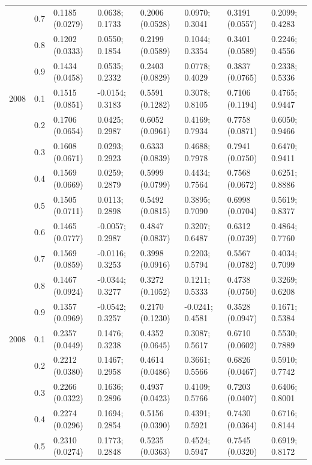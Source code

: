 \begin{table}
{\begin{tabular}[t]{llllllll}
 & 0.7 & 0.1185 (0.0279) & 0.0638; 0.1733 & 0.2006 (0.0528) & 0.0970; 0.3041 & 0.3191 (0.0557) & 0.2099; 0.4283\\
 & 0.8 & 0.1202 (0.0333) & 0.0550; 0.1854 & 0.2199 (0.0589) & 0.1044; 0.3354 & 0.3401 (0.0589) & 0.2246; 0.4556\\
 & 0.9 & 0.1434 (0.0458) & 0.0535; 0.2332 & 0.2403 (0.0829) & 0.0778; 0.4029 & 0.3837 (0.0765) & 0.2338; 0.5336\\
2008 & 0.1 & 0.1515 (0.0851) & -0.0154; 0.3183 & 0.5591 (0.1282) & 0.3078; 0.8105 & 0.7106 (0.1194) & 0.4765; 0.9447\\
 & 0.2 & 0.1706 (0.0654) & 0.0425; 0.2987 & 0.6052 (0.0961) & 0.4169; 0.7934 & 0.7758 (0.0871) & 0.6050; 0.9466\\
 & 0.3 & 0.1608 (0.0671) & 0.0293; 0.2923 & 0.6333 (0.0839) & 0.4688; 0.7978 & 0.7941 (0.0750) & 0.6470; 0.9411\\
 & 0.4 & 0.1569 (0.0669) & 0.0259; 0.2879 & 0.5999 (0.0799) & 0.4434; 0.7564 & 0.7568 (0.0672) & 0.6251; 0.8886\\
 & 0.5 & 0.1505 (0.0711) & 0.0113; 0.2898 & 0.5492 (0.0815) & 0.3895; 0.7090 & 0.6998 (0.0704) & 0.5619; 0.8377\\
 & 0.6 & 0.1465 (0.0777) & -0.0057; 0.2987 & 0.4847 (0.0837) & 0.3207; 0.6487 & 0.6312 (0.0739) & 0.4864; 0.7760\\
 & 0.7 & 0.1569 (0.0859) & -0.0116; 0.3253 & 0.3998 (0.0916) & 0.2203; 0.5794 & 0.5567 (0.0782) & 0.4034; 0.7099\\
 & 0.8 & 0.1467 (0.0924) & -0.0344; 0.3277 & 0.3272 (0.1052) & 0.1211; 0.5333 & 0.4738 (0.0750) & 0.3269; 0.6208\\
 & 0.9 & 0.1357 (0.0969) & -0.0542; 0.3257 & 0.2170 (0.1230) & -0.0241; 0.4581 & 0.3528 (0.0947) & 0.1671; 0.5384\\
2008 & 0.1 & 0.2357 (0.0449) & 0.1476; 0.3238 & 0.4352 (0.0645) & 0.3087; 0.5617 & 0.6710 (0.0602) & 0.5530; 0.7889\\
 & 0.2 & 0.2212 (0.0380) & 0.1467; 0.2958 & 0.4614 (0.0486) & 0.3661; 0.5566 & 0.6826 (0.0467) & 0.5910; 0.7742\\
 & 0.3 & 0.2266 (0.0322) & 0.1636; 0.2896 & 0.4937 (0.0423) & 0.4109; 0.5766 & 0.7203 (0.0407) & 0.6406; 0.8001\\
 & 0.4 & 0.2274 (0.0296) & 0.1694; 0.2854 & 0.5156 (0.0390) & 0.4391; 0.5921 & 0.7430 (0.0364) & 0.6716; 0.8144\\
 & 0.5 & 0.2310 (0.0274) & 0.1773; 0.2848 & 0.5235 (0.0363) & 0.4524; 0.5947 & 0.7545 (0.0320) & 0.6919; 0.8172\\

\end{tabular}}
\end{table}
